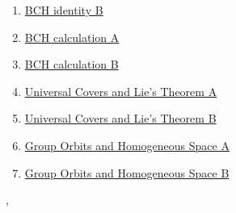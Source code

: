 \documentclass[11pt]{article}
\renewcommand{\today}{\shortmonthname[\the\month] \the \day,  \the\year}
\begin{document}
\begin{multicols}{2}
\begin{enumerate}
		\item \href{https://mp.weixin.qq.com/s/CtnEFSaldrhuunaqXQAb9Q}{BCH identity B}	%
		\item \href{https://mp.weixin.qq.com/s/rb1e4n9bvmtKc-Qiyl29MQ}{BCH calculation A}	%
		\item \href{https://mp.weixin.qq.com/s/b1YfLUegQtU436EpDY7AKQ}{BCH calculation B}	%
		\item \href{https://mp.weixin.qq.com/s/lIpMD_E4OF4etfRvNQdQtw}{Universal Covers and Lie's Theorem A}	%
		\item \href{https://mp.weixin.qq.com/s/4h456ccanu9pyKVVBhFDtA}{Universal Covers and Lie's Theorem B}	%
		\item \href{https://mp.weixin.qq.com/s/lHrR6lh8sie_05XuHgfjWg}{Group Orbits and Homogeneous Space A}	%
		\item \href{https://mp.weixin.qq.com/s/A8pLMNue1sUHd-MmpHn9TA}{Group Orbits and Homogeneous Space B}	%
	\end{enumerate}
\end{multicols}





%
\begin{flushright}
	\tiny \today 
\end{flushright}
\end{document}
